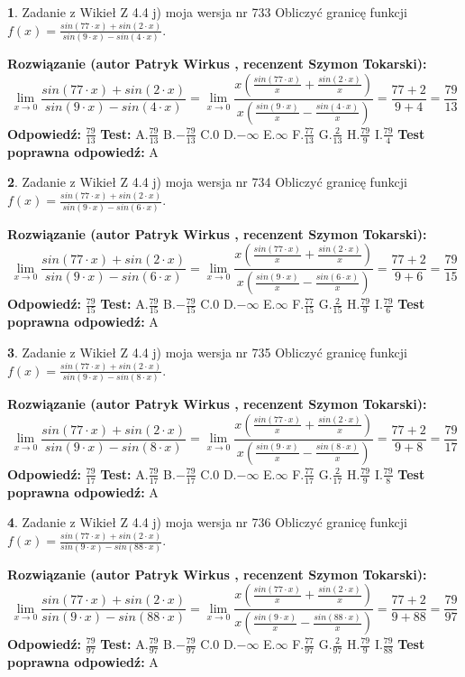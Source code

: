 \documentclass[12pt, a4paper]{article}
\theoremstyle{definition} %
\newtheorem{zad}{}
\newcommand{\zadStart}[1]{\begin{zad}#1\newline}
\newcommand{\zadStop}{\end{zad}}
\newcommand{\rozwStart}[2]{\noindent \textbf{Rozwiązanie (autor #1 , recenzent #2): }\newline}
\newcommand{\rozwStop}{\newline}
\newcommand{\odpStart}{\noindent \textbf{Odpowiedź:}\newline}
\newcommand{\odpStop}{\newline}
\newcommand{\testStart}{\noindent \textbf{Test:}\newline}
\newcommand{\testStop}{\newline}
\newcommand{\kluczStart}{\noindent \textbf{Test poprawna odpowiedź:}\newline}
\newcommand{\kluczStop}{\newline}
\begin{document}
\zadStart{Zadanie z Wikieł Z 4.4 j) moja wersja nr 733}
Obliczyć granicę funkcji $f(x)=\frac{sin(77\cdot x) +sin(2\cdot x)}{sin(9\cdot x) -sin(4\cdot x)}$.
\zadStop
\rozwStart{Patryk Wirkus}{Szymon Tokarski}
$$\lim\limits_{x\to 0}\frac{sin(77\cdot x) +sin(2\cdot x)}{sin(9\cdot x) -sin(4\cdot x)}=\lim\limits_{x\to 0}\frac{x(\frac{sin(77\cdot x)}{x}+\frac{sin(2\cdot x)}{x})}{x(\frac{sin(9\cdot x)}{x}-\frac{sin(4\cdot x)}{x})}=\frac{77+2}{9+4} = \frac{79}{13}$$
\rozwStop
\odpStart
$\frac{79}{13}$
\odpStop
\testStart
A.$\frac{79}{13}$
B.$-\frac{79}{13}$
C.$0$
D.$-\infty$
E.$\infty$
F.$\frac{77}{13}$
G.$\frac{2}{13}$
H.$\frac{79}{9}$
I.$\frac{79}{4}$
\testStop
\kluczStart
A
\kluczStop



\zadStart{Zadanie z Wikieł Z 4.4 j) moja wersja nr 734}
Obliczyć granicę funkcji $f(x)=\frac{sin(77\cdot x) +sin(2\cdot x)}{sin(9\cdot x) -sin(6\cdot x)}$.
\zadStop
\rozwStart{Patryk Wirkus}{Szymon Tokarski}
$$\lim\limits_{x\to 0}\frac{sin(77\cdot x) +sin(2\cdot x)}{sin(9\cdot x) -sin(6\cdot x)}=\lim\limits_{x\to 0}\frac{x(\frac{sin(77\cdot x)}{x}+\frac{sin(2\cdot x)}{x})}{x(\frac{sin(9\cdot x)}{x}-\frac{sin(6\cdot x)}{x})}=\frac{77+2}{9+6} = \frac{79}{15}$$
\rozwStop
\odpStart
$\frac{79}{15}$
\odpStop
\testStart
A.$\frac{79}{15}$
B.$-\frac{79}{15}$
C.$0$
D.$-\infty$
E.$\infty$
F.$\frac{77}{15}$
G.$\frac{2}{15}$
H.$\frac{79}{9}$
I.$\frac{79}{6}$
\testStop
\kluczStart
A
\kluczStop



\zadStart{Zadanie z Wikieł Z 4.4 j) moja wersja nr 735}
Obliczyć granicę funkcji $f(x)=\frac{sin(77\cdot x) +sin(2\cdot x)}{sin(9\cdot x) -sin(8\cdot x)}$.
\zadStop
\rozwStart{Patryk Wirkus}{Szymon Tokarski}
$$\lim\limits_{x\to 0}\frac{sin(77\cdot x) +sin(2\cdot x)}{sin(9\cdot x) -sin(8\cdot x)}=\lim\limits_{x\to 0}\frac{x(\frac{sin(77\cdot x)}{x}+\frac{sin(2\cdot x)}{x})}{x(\frac{sin(9\cdot x)}{x}-\frac{sin(8\cdot x)}{x})}=\frac{77+2}{9+8} = \frac{79}{17}$$
\rozwStop
\odpStart
$\frac{79}{17}$
\odpStop
\testStart
A.$\frac{79}{17}$
B.$-\frac{79}{17}$
C.$0$
D.$-\infty$
E.$\infty$
F.$\frac{77}{17}$
G.$\frac{2}{17}$
H.$\frac{79}{9}$
I.$\frac{79}{8}$
\testStop
\kluczStart
A
\kluczStop



\zadStart{Zadanie z Wikieł Z 4.4 j) moja wersja nr 736}
Obliczyć granicę funkcji $f(x)=\frac{sin(77\cdot x) +sin(2\cdot x)}{sin(9\cdot x) -sin(88\cdot x)}$.
\zadStop
\rozwStart{Patryk Wirkus}{Szymon Tokarski}
$$\lim\limits_{x\to 0}\frac{sin(77\cdot x) +sin(2\cdot x)}{sin(9\cdot x) -sin(88\cdot x)}=\lim\limits_{x\to 0}\frac{x(\frac{sin(77\cdot x)}{x}+\frac{sin(2\cdot x)}{x})}{x(\frac{sin(9\cdot x)}{x}-\frac{sin(88\cdot x)}{x})}=\frac{77+2}{9+88} = \frac{79}{97}$$
\rozwStop
\odpStart
$\frac{79}{97}$
\odpStop
\testStart
A.$\frac{79}{97}$
B.$-\frac{79}{97}$
C.$0$
D.$-\infty$
E.$\infty$
F.$\frac{77}{97}$
G.$\frac{2}{97}$
H.$\frac{79}{9}$
I.$\frac{79}{88}$
\testStop
\kluczStart
A
\kluczStop
\end{document}
